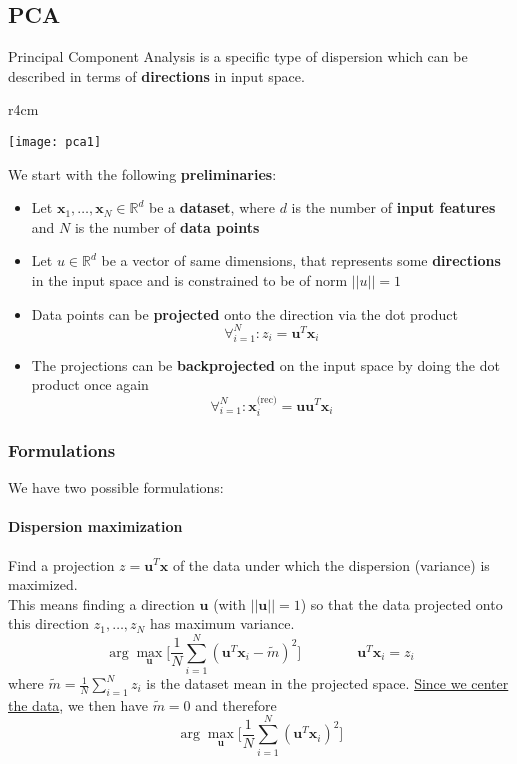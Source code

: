 \subsection{PCA}
Principal Component Analysis is a specific type of dispersion which can be described in terms of \textbf{directions} in input space.\\
\begin{wrapfigure}[10]{r}{4cm}
	\vspace{-0.5cm}
	\begin{center}
		\texttt{[image: pca1]}
	\end{center}
\end{wrapfigure}
We start with the following \textbf{preliminaries}:
\begin{itemize}
	\item Let $\mathbf{x}_1, \ldots, \mathbf{x}_N \in \mathbb{R}^d$ be a \textbf{dataset}, where $d$ is the number of \textbf{input features} and $N$ is the number of \textbf{data points}
	\item Let $u \in \mathbb{R}^d$ be a vector of same dimensions, that represents some \textbf{directions} in the input space and is constrained to be of norm $\lvert\lvert u \rvert\rvert = 1$
	\item Data points can be \textbf{projected} onto the direction via the dot product
	\begin{equation}
		\forall_{i=1}^N : z_i = \mathbf{u}^T \mathbf{x}_i
	\end{equation}
	\item The projections can be \textbf{backprojected} on the input space by doing the dot product once again
	\begin{equation}
		\forall_{i=1}^N: \mathbf{x}_i^{\text{(rec)}} = \mathbf{u}\mathbf{u}^T \mathbf{x}_i
	\end{equation}
\end{itemize}
\subsubsection{Formulations}
We have two possible formulations:
\paragraph{Dispersion maximization} Find a projection $z = \mathbf{u}^T \mathbf{x}$ of the data under which the dispersion (variance) is maximized.\\
This means finding a direction $\mathbf{u}$ (with $\lvert\lvert \mathbf{u} \rvert\rvert = 1$) so that the data projected onto this direction $z_1, \ldots, z_N$ has maximum variance.
\begin{equation}
	\arg\max_\mathbf{u} \big[\frac{1}{N} \sum_{i=1}^N(\mathbf{u}^T\mathbf{x}_i-\tilde{m})^2\big] \qquad\qquad \mathbf{u}^T\mathbf{x}_i = z_i
\end{equation}
where $\tilde{m} = \frac{1}{N} \sum_{i=1}^Nz_i$ is the dataset mean in the projected space. \underline{Since we center the data}, we then have $\tilde{m}=0$ and therefore
\begin{equation}
	\label{eq:dispmax}
	\arg\max_\mathbf{u} \big[\frac{1}{N} \sum_{i=1}^N(\mathbf{u}^T\mathbf{x}_i)^2\big]
\end{equation}
